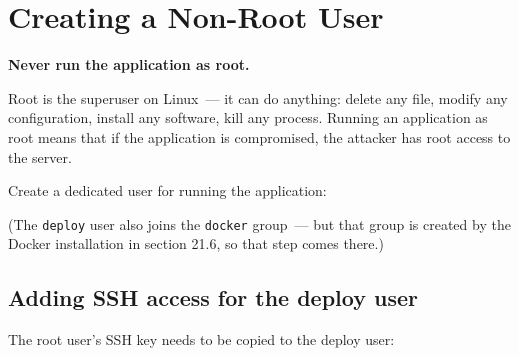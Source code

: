 \setcounter{section}{2}
\section{Creating a Non-Root User}\label{21-system-setup:213-creating-a-non-root-user}

\textbf{Never run the application as root.}

Root is the superuser on Linux~--- it can do anything: delete any file, modify any configuration, install any software, kill any process. Running an application as root means that if the application is compromised, the attacker has root access to the server.

Create a dedicated user for running the application:

\begin{codebox}[short]

\begin{Shaded}
\begin{Highlighting}[]
  


 
\end{Highlighting}
\end{Shaded}

\end{codebox}

\noindent{}(The \texttt{deploy} user also joins the \texttt{docker} group~--- but that group is created by the Docker installation in section 21.6, so that step comes there.)

\subsection*{Adding SSH access for the deploy user}\label{21-system-setup:adding-ssh-access-for-the-deploy-user}

The root user's SSH key needs to be copied to the deploy user:

